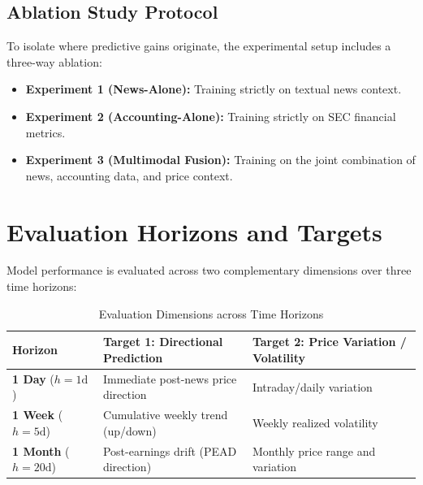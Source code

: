 \documentclass[11pt,a4paper]{article}
\begin{document}
\subsection{Ablation Study Protocol}
To isolate where predictive gains originate, the experimental setup includes a three-way ablation:
\begin{itemize}[leftmargin=*]
    \item \textbf{Experiment 1 (News-Alone):} Training strictly on textual news context.
    \item \textbf{Experiment 2 (Accounting-Alone):} Training strictly on SEC financial metrics.
    \item \textbf{Experiment 3 (Multimodal Fusion):} Training on the joint combination of news, accounting data, and price context.
\end{itemize}

\section{Evaluation Horizons and Targets}
\label{sec:evaluation}

Model performance is evaluated across two complementary dimensions over three time horizons:

\begin{table}[htbp]
\centering
\small
\caption{Evaluation Dimensions across Time Horizons}
\label{tab:horizons}
\begin{tabularx}{\textwidth}{lll}
\toprule
\textbf{Horizon} & \textbf{Target 1: Directional Prediction} & \textbf{Target 2: Price Variation / Volatility} \\
\midrule
\textbf{1 Day} ($h=1\text{d}$)   & Immediate post-news price direction & Intraday/daily variation \\
\textbf{1 Week} ($h=5\text{d}$)  & Cumulative weekly trend (up/down)   & Weekly realized volatility \\
\textbf{1 Month} ($h=20\text{d}$)& Post-earnings drift (PEAD direction)& Monthly price range and variation \\
\bottomrule
\end{tabularx}
\end{table}

\end{document}
